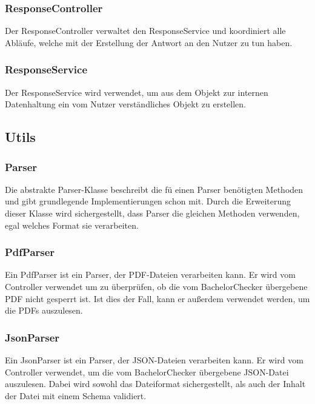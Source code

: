 \subsubsection{ResponseController}\label{subsubsec:response_controller}
Der ResponseController verwaltet den ResponseService und koordiniert alle Abläufe,
welche mit der Erstellung der Antwort an den Nutzer zu tun haben.

\subsubsection{ResponseService}\label{subsubsec:response_service}
Der ResponseService wird verwendet, um aus dem Objekt zur internen Datenhaltung ein vom Nutzer verständliches Objekt zu erstellen.

\subsection{Utils}\label{subsec:utils}

\subsubsection{Parser}\label{subsubsec:parser}
Die abstrakte Parser-Klasse beschreibt die fü einen Parser benötigten Methoden und gibt grundlegende Implementierungen schon mit.
Durch die Erweiterung dieser Klasse wird sichergestellt,
dass Parser die gleichen Methoden verwenden, egal welches Format sie verarbeiten.

\subsubsection{PdfParser}\label{subsubsec:pdf_parser}
Ein PdfParser ist ein Parser, der PDF-Dateien verarbeiten kann.
Er wird vom Controller verwendet um zu überprüfen, ob die vom BachelorChecker übergebene PDF nicht gesperrt ist.
Ist dies der Fall, kann er außerdem verwendet werden, um die PDFs auszulesen.

\subsubsection{JsonParser}\label{subsubsec:json_parser}
Ein JsonParser ist ein Parser, der JSON-Dateien verarbeiten kann.
Er wird vom Controller verwendet, um die vom BachelorChecker übergebene JSON-Datei auszulesen.
Dabei wird sowohl das Dateiformat sichergestellt, als auch der Inhalt der Datei mit einem Schema validiert.